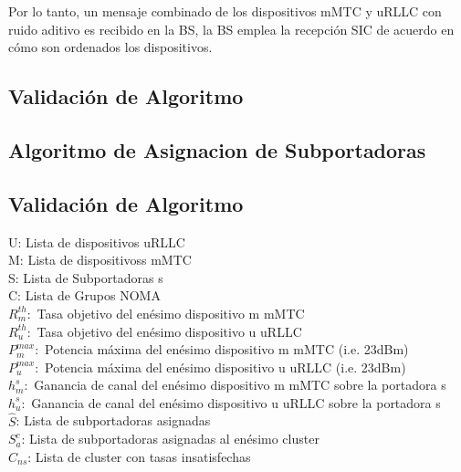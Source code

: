 Por lo tanto, un mensaje combinado de los dispositivos mMTC y uRLLC con ruido aditivo es recibido en la BS, la BS emplea la recepción SIC de acuerdo en cómo son ordenados los dispositivos. \\


\subsection{Validación de Algoritmo}

\subsection{Algoritmo de Asignacion de Subportadoras}

\subsection{Validación de Algoritmo}


U: Lista de dispositivos uRLLC\\
M: Lista de dispositivoss mMTC\\
S: Lista de Subportadoras s\\
C: Lista de Grupos NOMA\\
 $R_{m}^{th}:$ Tasa objetivo del enésimo dispositivo m mMTC\\ 
 $R_{u}^{th}:$ Tasa objetivo del enésimo dispositivo u uRLLC\\
 $P_{m}^{max}:$ Potencia máxima del enésimo dispositivo m mMTC (i.e. 23dBm)\\
 $P_{u}^{max}:$ Potencia máxima del enésimo dispositivo u uRLLC (i.e. 23dBm)\\
 $h_{m}^{s}:$ Ganancia de canal del enésimo dispositivo m mMTC sobre la portadora s\\
 $h_{u}^{s}:$ Ganancia de canal del enésimo dispositivo u uRLLC sobre la portadora s\\
 ${\hat S}$: Lista de subportadoras asignadas\\
 $S_{a}^{c}$: Lista de subportadoras asignadas al enésimo cluster\\
 ${C_{ns}}$: Lista de cluster con tasas insatisfechas\\

\makeatletter
\def\algbackskip{\hskip-\ALG@thistlm}
\makeatother

